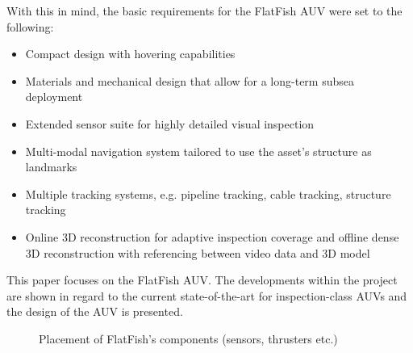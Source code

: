 \documentclass[conference]{IEEEtran}
\begin{document}
With this in mind, the basic requirements for the FlatFish AUV were set to the following:

\begin{itemize}
    \item Compact design with hovering capabilities
    \item Materials and mechanical design that allow for a long-term subsea deployment
    \item Extended sensor suite for highly detailed visual inspection
    \item Multi-modal navigation system tailored to use the asset's structure as landmarks
    \item Multiple tracking systems, e.g. pipeline tracking, cable tracking, structure
        tracking
    \item Online 3D reconstruction for adaptive inspection coverage and offline dense 3D
        reconstruction with referencing between video data and 3D model
\end{itemize}

This paper focuses on the FlatFish AUV. The developments within the project are shown in regard to the current state-of-the-art for inspection-class AUVs and the design of the AUV is
presented.


\begin{figure}[!t]
	\begin{center}
		\centering
		\hfil
		\caption{Placement of FlatFish's components (sensors, thrusters etc.)}
		\label{fig:sensor_placement}
	\end{center}
\end{figure}
\end{document}
